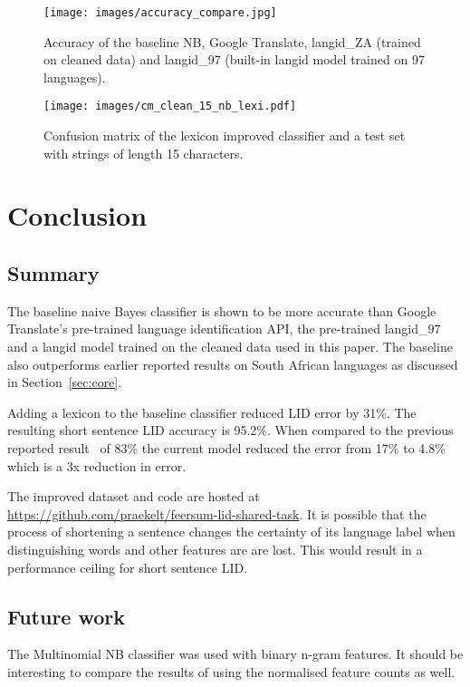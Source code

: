 \documentclass[conference]{IEEEtran}
\begin{document}

\begin{figure}[!t]
\centering
\texttt{[image: images/accuracy\_compare.jpg]}
\caption{Accuracy of the baseline NB, Google Translate, langid\_ZA (trained on cleaned data) and langid\_97 (built-in langid model trained on 97 languages).}
\label{fig:accuracy_compare}
\end{figure}

\begin{figure*}[!t]
\centering
\texttt{[image: images/cm\_clean\_15\_nb\_lexi.pdf]}
\caption{Confusion matrix of the lexicon improved classifier and a test set with strings of length 15 characters.}
\label{fig:cm_clean_15_nb_lexi}
\end{figure*}

\section{Conclusion}
\label{sec:conclusion}
\subsection{Summary}
The baseline naive Bayes classifier is shown to be more accurate than Google Translate's pre-trained language identification API, the pre-trained langid\_97 and a langid model trained on the cleaned data used in this paper. The baseline also outperforms earlier reported results on South African languages as discussed in Section~\ref{sec:core}.

Adding a lexicon to the baseline classifier reduced LID error by 31\%. The resulting short sentence LID accuracy is 95.2\%. When compared to the previous reported result~\cite{BothaBarnard2012} of 83\% the current model reduced the error from 17\% to 4.8\% which is a 3x reduction in error. 

The improved dataset and code are hosted at \url{https://github.com/praekelt/feersum-lid-shared-task}. It is possible that the process of shortening a sentence changes the certainty of its language label when distinguishing words and other features are are lost. This would result in a performance ceiling for short sentence LID.




\subsection{Future work}
The Multinomial NB classifier was used with binary n-gram features. It should be interesting to compare the results of using the normalised feature counts as well.
\end{document}
